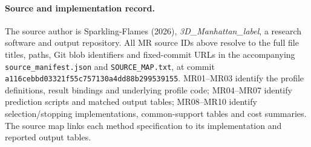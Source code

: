 \paragraph{Source and implementation record.}
The source author is Sparkling-Flames (2026), \emph{3D\_Manhattan\_label},
a research software and output repository. All MR source IDs above resolve
to the full file titles, paths, Git blob identifiers and fixed-commit URLs
in the accompanying \texttt{source\_manifest.json} and
\texttt{SOURCE\_MAP.txt}, at commit
\texttt{a116cebbd03321f55c757130a4dd88b299539155}.
MR01--MR03 identify the profile definitions, result bindings and
underlying profile code; MR04--MR07 identify prediction scripts and matched
output tables; MR08--MR10 identify selection/stopping implementations,
common-support tables and cost summaries.
The source map links each method specification to its implementation and
reported output tables.

